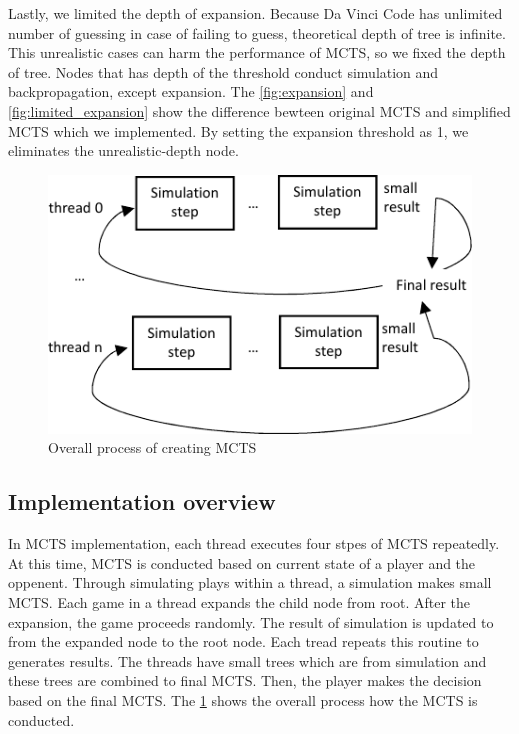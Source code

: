 Lastly, we limited the depth of expansion. 
Because Da Vinci Code has unlimited number of guessing in case of failing to guess, theoretical depth of tree is infinite.
This unrealistic cases can harm the performance of MCTS, so we fixed the depth of tree.
Nodes that has depth of the threshold conduct simulation and backpropagation, except expansion.
The \cref{fig:expansion} and \cref{fig:limited_expansion} show the difference bewteen original MCTS and simplified MCTS which we implemented.
By setting the expansion threshold as 1, we eliminates the unrealistic-depth node.


\begin{figure}
\includegraphics[width=0.95\columnwidth]{figures/implementation.pdf}
\caption{Overall process of creating MCTS}
\label{fig:implementation}
\end{figure}

\subsection{Implementation overview}
In MCTS implementation, each thread executes four stpes of MCTS repeatedly.
At this time, MCTS is conducted based on current state of a player and the oppenent.
Through simulating plays within a thread, a simulation makes small MCTS.
Each game in a thread expands the child node from root.
After the expansion, the game proceeds randomly. 
The result of simulation is updated to from the expanded node to the root node.
Each tread repeats this routine to generates results. 
The threads have small trees which are from simulation and these trees are combined to final MCTS.
Then, the player makes the decision based on the final MCTS.
The \cref{fig:implementation} shows the overall process how the MCTS is conducted.

